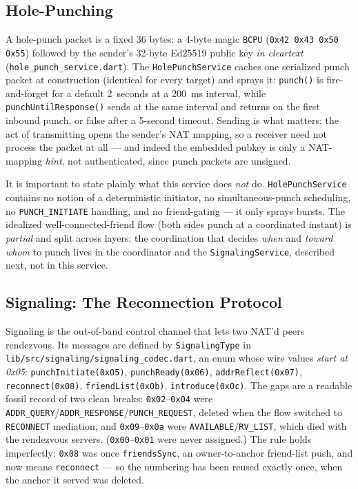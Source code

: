 \documentclass[11pt]{report}
\newcommand{\code}[1]{\texttt{\small #1}}
\begin{document}
\subsection{Hole-Punching}

A hole-punch packet is a fixed 36 bytes: a 4-byte magic \code{BCPU} (\code{0x42 0x43 0x50 0x55}) followed by the sender's 32-byte Ed25519 public key \emph{in cleartext} (\code{hole_punch_service.dart}). The \code{HolePunchService} caches one serialized punch packet at construction (identical for every target) and sprays it: \code{punch()} is fire-and-forget for a default 2~seconds at a 200~ms interval, while \code{punchUntilResponse()} sends at the same interval and returns on the first inbound punch, or false after a 5-second timeout. Sending is what matters: the act of transmitting opens the sender's NAT mapping, so a receiver need not process the packet at all --- and indeed the embedded pubkey is only a NAT-mapping \emph{hint}, not authenticated, since punch packets are unsigned.

It is important to state plainly what this service does \emph{not} do. \code{HolePunchService} contains no notion of a deterministic initiator, no simultaneous-punch scheduling, no \code{PUNCH\_INITIATE} handling, and no friend-gating --- it only sprays bursts. The idealized well-connected-friend flow (both sides punch at a coordinated instant) is \emph{partial} and split across layers: the coordination that decides \emph{when} and \emph{toward whom} to punch lives in the coordinator and the \code{SignalingService}, described next, not in this service.

\subsection{Signaling: The Reconnection Protocol}

Signaling is the out-of-band control channel that lets two NAT'd peers rendezvous. Its messages are defined by \code{SignalingType} in \code{lib/src/signaling/signaling_codec.dart}, an enum whose wire values \emph{start at 0x05}: \code{punchInitiate(0x05)}, \code{punchReady(0x06)}, \code{addrReflect(0x07)}, \code{reconnect(0x08)}, \code{friendList(0x0b)}, \code{introduce(0x0c)}. The gaps are a readable fossil record of two clean breaks: \code{0x02}--\code{0x04} were \code{ADDR\_QUERY}/\code{ADDR\_RESPONSE}/\code{PUNCH\_REQUEST}, deleted when the flow switched to \code{RECONNECT} mediation, and \code{0x09}--\code{0x0a} were \code{AVAILABLE}/\code{RV\_LIST}, which died with the rendezvous servers. (\code{0x00}--\code{0x01} were never assigned.) The rule holds imperfectly: \code{0x08} was once \code{friendsSync}, an owner-to-anchor friend-list push, and now means \code{reconnect} --- so the numbering has been reused exactly once, when the anchor it served was deleted.
\end{document}
